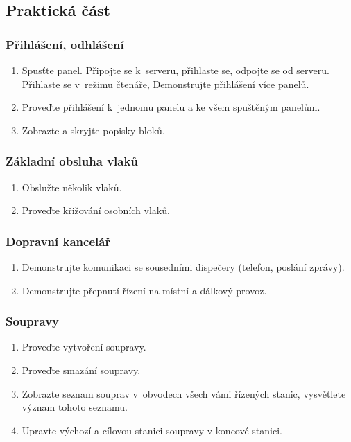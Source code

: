 \documentclass[12pt,a4paper]{article}
\begin{document}
\subsection{Praktická část}

\subsubsection*{Přihlášení, odhlášení}
\begin{enumerate}[leftmargin=*]
\item Spusťte panel. Připojte se k~serveru, přihlaste se, odpojte se od
serveru. Přihlaste se v~režimu čtenáře, Demonstrujte přihlášení více panelů.
\item Proveďte přihlášení k~jednomu panelu a ke všem spuštěným panelům.
\item Zobrazte a skryjte popisky bloků.
\end{enumerate}

\subsubsection*{Základní obsluha vlaků}
\begin{enumerate}[leftmargin=*]
\item Obslužte několik vlaků.
\item Proveďte křižování osobních vlaků.
\end{enumerate}

\subsubsection*{Dopravní kancelář}
\begin{enumerate}[leftmargin=*]
\item Demonstrujte komunikaci se sousedními dispečery (telefon, poslání zprávy).
\item Demonstrujte přepnutí řízení na místní a dálkový provoz.
\end{enumerate}

\subsubsection*{Soupravy}
\begin{enumerate}[leftmargin=*]
\item Proveďte vytvoření soupravy.
\item Proveďte smazání soupravy.
\item Zobrazte seznam souprav v~obvodech všech vámi řízených stanic, vysvětlete
význam tohoto seznamu.
\item Upravte výchozí a cílovou stanici soupravy v koncové stanici.
\end{enumerate}
\end{document}
